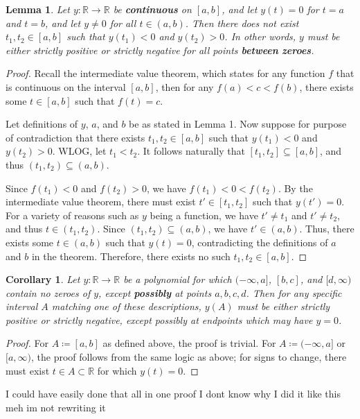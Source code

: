\documentclass[11pt, letterpaper]{report}
\newtheorem{lama}{Lemma}
\newtheorem{corry}{Corollary}
\begin{document}
\begin{lama}\label{thm:1}
	Let $y : \mathbb{R} \to \mathbb{R}$ be \textbf{continuous} on $[a,b]$, and let $y(t)=0$ for $t=a$ and $t=b$, and let $y\neq 0$ for all $t\in\left( a,b \right) $. Then there does not exist $t_1,t_2\in\left[ a,b \right] $ such that $y\left( t_1 \right) <0$ and $y\left( t_2 \right) >0$. In other words, $y$ must be either strictly positive or strictly negative for all points \textbf{between} \textbf{zeroes}.
\end{lama}
\begin{proof}
	Recall the intermediate value theorem, which states for any function $f$ that is continuous on the interval $[a,b]$, then for any $f(a)<c<f(b)$, there exists some $t\in[a,b]$ such that $f(t)=c$.

	Let definitions of $y$, $a$, and $b$ be as stated in Lemma 1. Now suppose for purpose of contradiction that there exists $t_1,t_2\in\left[ a,b \right] $ such that $y(t_1)<0$ and $y(t_2)>0$. WLOG, let $t_1<t_2$. It follows naturally that $[t_1,t_2]\subseteq [a,b]$, and thus $(t_1,t_2)\subseteq (a,b)$.

	Since $f(t_1)<0$ and $f(t_2)>0$, we have $f(t_1)<0<f(t_2)$. By the intermediate value theorem, there must exist $t'\in [t_1,t_2]$ such that $y\left( t' \right) =0$. For a variety of reasons such as $y$ being a function, we have $t'\neq t_1$ and $t'\neq t_2$, and thus $t\in \left( t_1,t_2 \right) $. Since $(t_1,t_2)\subseteq (a,b)$, we have $t'\in(a,b)$. Thus, there exists some $t\in(a,b)$ such that $y(t)=0$, contradicting the definitions of $a$ and $b$ in the theorem. Therefore, there exists no such $t_1,t_2\in[a,b]$.
\end{proof}
\begin{corry}
	Let $y : \mathbb{R} \to \mathbb{R}$ be a polynomial for which $(-\infty,a]$, $[b,c]$, and $[d,\infty)$ contain no zeroes of $y$, except \textbf{possibly} at points $a,b,c,d$. Then for any specific interval $A$ matching one of these descriptions, $y(A)$ must be either strictly positive or strictly negative, except possibly at endpoints which may have $y=0$.
\end{corry}
\begin{proof}
	For $A\coloneqq [a,b]$ as defined above, the proof is trivial. For $A\coloneqq (-\infty,a]$ or $[a,\infty)$, the proof follows from the same logic as above; for signs to change, there must exist $t\in A\subset \mathbb{R}$ for which $y(t)=0$.
\end{proof}
I could have easily done that all in one proof I dont know why I did it like this meh im not rewriting it
\end{document}

